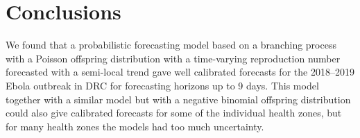 \documentclass[12pt]{article}
\begin{document}





\section{Conclusions}
We found that a probabilistic forecasting model based on a branching process with a Poisson offspring distribution with a time-varying reproduction number forecasted with a semi-local trend gave well calibrated forecasts for the 2018--2019 Ebola outbreak in DRC for forecasting horizons up to 9 days. This model together with a similar model but with a negative binomial offspring distribution could also give calibrated forecasts for some of the individual health zones, but for many health zones the models had too much uncertainty. 


\newpage

 


\clearpage
\newpage

\appendix
\appendixpage
\addappheadtotoc
{}

\end{document}
